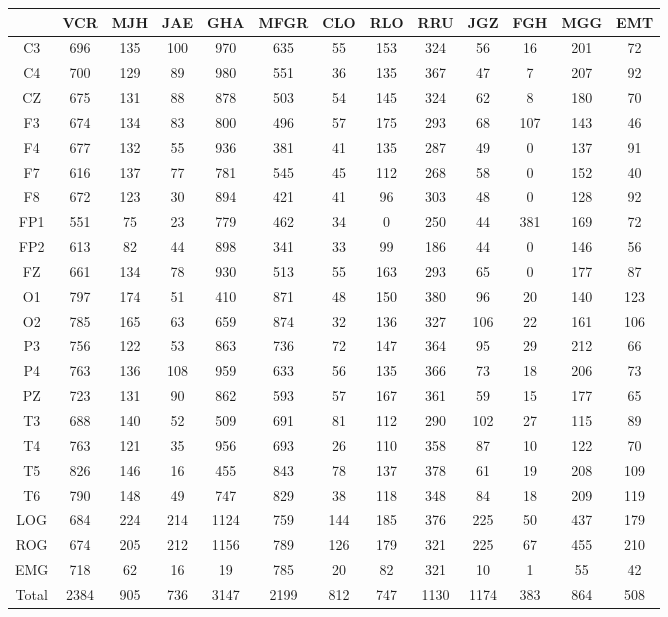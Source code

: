 \begin{SidewaysFigure}
\centering
\begin{tabular}{c|ccccc|cccc|ccc}
& VCR & MJH & JAE & GHA & MFGR
& CLO & RLO & RRU & JGZ
& FGH & MGG & EMT \\
\hline
C3&696&135&100&970&635&55&153&324&56&16&201&72 \\
C4&700&129&89&980&551&36&135&367&47&7&207&92 \\
CZ&675&131&88&878&503&54&145&324&62&8&180&70 \\
F3&674&134&83&800&496&57&175&293&68&107&143&46 \\
F4&677&132&55&936&381&41&135&287&49&0&137&91 \\
F7&616&137&77&781&545&45&112&268&58&0&152&40 \\
F8&672&123&30&894&421&41&96&303&48&0&128&92 \\
FP1&551&75&23&779&462&34&0&250&44&381&169&72 \\
FP2&613&82&44&898&341&33&99&186&44&0&146&56 \\
FZ&661&134&78&930&513&55&163&293&65&0&177&87 \\
O1&797&174&51&410&871&48&150&380&96&20&140&123 \\
O2&785&165&63&659&874&32&136&327&106&22&161&106 \\
P3&756&122&53&863&736&72&147&364&95&29&212&66 \\
P4&763&136&108&959&633&56&135&366&73&18&206&73 \\
PZ&723&131&90&862&593&57&167&361&59&15&177&65 \\
T3&688&140&52&509&691&81&112&290&102&27&115&89 \\
T4&763&121&35&956&693&26&110&358&87&10&122&70 \\
T5&826&146&16&455&843&78&137&378&61&19&208&109 \\
T6&790&148&49&747&829&38&118&348&84&18&209&119 \\
LOG&684&224&214&1124&759&144&185&376&225&50&437&179 \\
ROG&674&205&212&1156&789&126&179&321&225&67&455&210 \\
EMG&718&62&16&19&785&20&82&321&10&1&55&42 \\
\hline
Total&2384&905&736&3147&2199&812&747&1130&1174&383&864&508
\end{tabular}
\caption{Total  de \'epocas PE dentro del registro pero que no fueron clasificadas
como MOR (fases W y N) para cada
canal. %
}
\label{total_gpos_nmor}
\end{SidewaysFigure}

